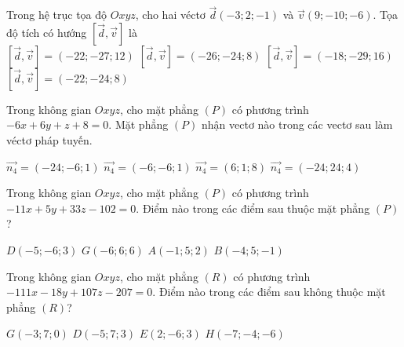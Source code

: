 \documentclass[12pt,a4paper]{article}
\begin{document}
\begin{ex}
 Trong hệ trục tọa độ ${Oxyz}$, cho hai véctơ $\overrightarrow{d}(-3;2;-1)$ và $\overrightarrow{v}(9;-10;-6)$. Tọa độ tích có hướng $\left[\overrightarrow{d},\overrightarrow{v}\right]$ là\\ 
\choice
{ \True $\left[\overrightarrow{d},\overrightarrow{v}\right]= (-22;-27;12)$ }
   { $\left[\overrightarrow{d},\overrightarrow{v}\right]=(-26;-24;8)$ }
     { $\left[\overrightarrow{d},\overrightarrow{v}\right]=(-18;-29;16)$ }
    { $\left[\overrightarrow{d},\overrightarrow{v}\right]=(-22;-24;8)$ }
\end{ex}

\begin{ex}
 Trong không gian ${Oxyz}$, cho mặt phẳng ${(P)}$ có phương trình $- 6 x + 6 y + z + 8=0$. Mặt phẳng ${(P)}$ nhận vectơ nào trong các vectơ sau làm véctơ pháp tuyến.
 
\choice
{ $\overrightarrow{n_4}=(-24;-6;1)$ }
   { $\overrightarrow{n_4}=(-6;-6;1)$ }
     { $\overrightarrow{n_4}=(6;1;8)$ }
    { \True $\overrightarrow{n_4}=(-24;24;4)$ }
\end{ex}

\begin{ex}
 Trong không gian ${Oxyz}$, cho mặt phẳng ${(P)}$ có phương trình $- 11 x + 5 y + 33 z - 102=0$. Điểm nào trong các điểm sau thuộc mặt phẳng ${(P)}$?
 
\choice
{ $D(-5;-6;3)$ }
   { $G(-6;6;6)$ }
     { \True $A(-1;5;2)$ }
    { $B(-4;5;-1)$ }
\end{ex}

\begin{ex}
 Trong không gian ${Oxyz}$, cho mặt phẳng ${(R)}$ có phương trình $- 111 x - 18 y + 107 z - 207=0$. Điểm nào trong các điểm sau không thuộc mặt phẳng ${(R)}$?
 
\choice
{ $G(-3;7;0)$ }
   { \True $D(-5;7;3)$ }
     { $E(2;-6;3)$ }
    { $H(-7;-4;-6)$ }
\end{ex}
\end{document}
